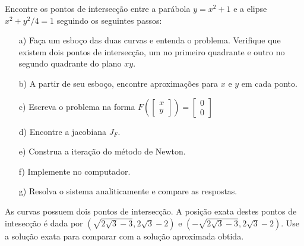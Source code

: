 \begin{exer}\label{prob_para_elipse}
 Encontre os pontos de intersecção entre a parábola $y=x^2+1$ e a elipse $x^2+y^2/4=1$ seguindo os seguintes passos:
\begin{itemize}
\item[a)] Faça um esboço das duas curvas e entenda o problema. Verifique que existem dois pontos de intersecção, um no primeiro quadrante e outro no segundo quadrante do plano $xy$.
\item[b)] A partir de seu esboço, encontre aproximações para $x$ e $y$ em cada ponto.
\item[c)] Escreva o problema na forma $F\left(\left[\begin{array}{c}x\\y\end{array}\right]\right)=\left[\begin{array}{c}0\\0\end{array}\right]$
\item[d)] Encontre a jacobiana $J_F$.
\item[e)] Construa a iteração do método de Newton.
\item[f)] Implemente no computador.
\item[g)] Resolva o sistema analiticamente e compare as respostas.
\end{itemize}
\end{exer}
\begin{resp}
As curvas possuem dois pontos de intersecção. A posição exata destes pontos de intesecção é dada por $\left(\sqrt{2\sqrt{3}-3},2\sqrt{3}-2\right)$ e $\left(-\sqrt{2\sqrt{3}-3},2\sqrt{3}-2\right)$. Use a solução exata para comparar com a solução aproximada obtida.
\end{resp}

